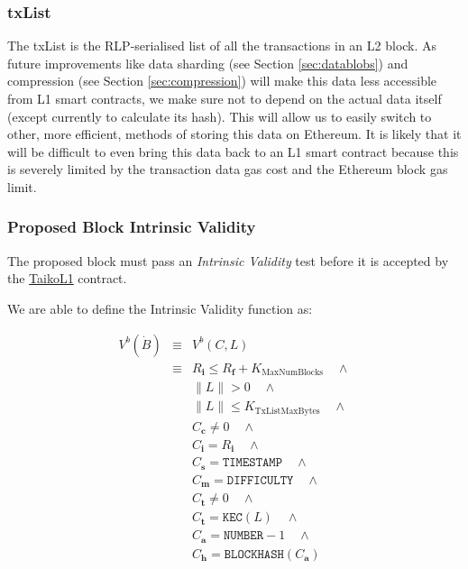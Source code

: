 \documentclass[9pt,oneside]{amsart}
\begin{document}
\begin{multicols}{2}
\subsubsection{txList}\label{sec:txlist}
The txList is the RLP-serialised list of all the transactions in an L2 block. As future improvements like data sharding (see Section \ref{sec:datablobs}) and compression (see Section \ref{sec:compression}) will make this data less accessible from L1 smart contracts, we make sure not to depend on the actual data itself (except currently to calculate its hash). This will allow us to easily switch to other, more efficient, methods of storing this data on Ethereum. It is likely that it will be difficult to even bring this data back to an L1 smart contract because this is severely limited by the transaction data gas cost and the Ethereum block gas limit.

\subsubsection{Proposed Block Intrinsic Validity}
The proposed block must pass an \emph{Intrinsic Validity} test before it is accepted by the \underline{TaikoL1} contract. 

We are able to define the Intrinsic Validity function as:

\begin{eqnarray}
V^{b}(\dot{B}) & \equiv &   V^{b}(C,L)  \\
\nonumber & \equiv &   R_\mathbf{i} \le R_\mathbf{f} + K_\mathrm{MaxNumBlocks}   \quad \wedge \\
\nonumber& & \lVert L \rVert > 0 \quad \wedge \\
\nonumber & & \lVert L \rVert \le K_{\mathrm{TxListMaxBytes}} \quad \wedge \\
\nonumber& & C_{\mathbf{c}} \ne 0   \quad \wedge \\
\nonumber& & C_{\mathbf{i}} = R_\mathbf{i}   \quad \wedge \\
\nonumber& & C_{\mathbf{s}} = \texttt{TIMESTAMP}   \quad \wedge \\
\nonumber& & C_{\mathbf{m}} = \texttt{DIFFICULTY}   \quad \wedge \\
\nonumber& & C_{\mathbf{t}} \ne 0   \quad \wedge \\
\nonumber& & C_{\mathbf{t}} = \texttt{KEC}(L)   \quad \wedge \\
\nonumber& & C_{\mathbf{a}} = \texttt{NUMBER} - 1   \quad \wedge \\
\nonumber& & C_{\mathbf{h}} = \texttt{BLOCKHASH}(C_{\mathbf{a}})
\end{eqnarray}


\end{multicols}
\end{document}
